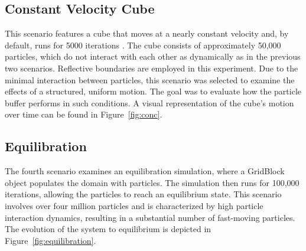 \subsection{Constant Velocity Cube} This scenario features a cube that moves at a nearly constant velocity and, by default, runs for 5000 iterations \parencite{gall2023exploration}. The cube consists of approximately 50,000 particles, which do not interact with each other as dynamically as in the previous two scenarios. Reflective boundaries are employed in this experiment. Due to the minimal interaction between particles, this scenario was selected to examine the effects of a structured, uniform motion. The goal was to evaluate how the particle buffer performs in such conditions. A visual representation of the cube's motion over time can be found in Figure~\ref{fig:conc}.

\subsection{Equilibration}
The fourth scenario examines an equilibration simulation, where a GridBlock object populates the domain with particles. The simulation then runs for 100,000 iterations, allowing the particles to reach an equilibrium state. This scenario involves over four million particles and is characterized by high particle interaction dynamics, resulting in a substantial number of fast-moving particles. The evolution of the system to equilibrium is depicted in Figure~\ref{fig:equilibration}.


\vspace{1em} 
\vspace{1em} 
\vspace{1em} 

